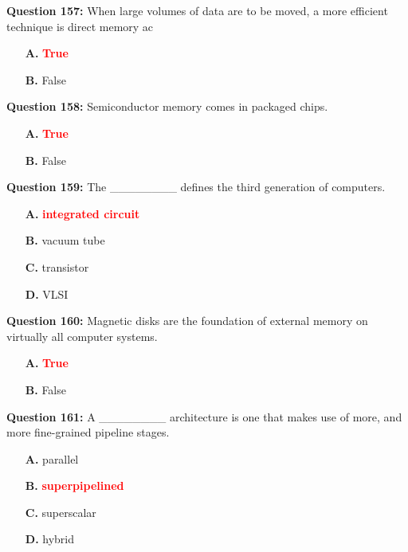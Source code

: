 \documentclass[12pt,a4paper]{article}
\begin{document}
\vspace{0.5cm}

\textbf{Question 157:} When large volumes of data are to be moved, a more efficient technique is direct memory ac

\begin{itemize}
    \item[\textbf{A.}] \textcolor{red}{\textbf{True}}
    \item[\textbf{B.}] False
\end{itemize}

\vspace{0.5cm}

\textbf{Question 158:} Semiconductor memory comes in packaged chips.

\begin{itemize}
    \item[\textbf{A.}] \textcolor{red}{\textbf{True}}
    \item[\textbf{B.}] False
\end{itemize}

\vspace{0.5cm}

\textbf{Question 159:} The ________ defines the third generation of computers.

\begin{itemize}
    \item[\textbf{A.}] \textcolor{red}{\textbf{integrated circuit}}
    \item[\textbf{B.}] vacuum tube
    \item[\textbf{C.}] transistor
    \item[\textbf{D.}] VLSI
\end{itemize}

\vspace{0.5cm}

\textbf{Question 160:} Magnetic disks are the foundation of external memory on virtually all computer systems.

\begin{itemize}
    \item[\textbf{A.}] \textcolor{red}{\textbf{True}}
    \item[\textbf{B.}] False
\end{itemize}

\vspace{0.5cm}

\textbf{Question 161:} A ________ architecture is one that makes use of more, and more fine-grained pipeline stages.

\begin{itemize}
    \item[\textbf{A.}] parallel
    \item[\textbf{B.}] \textcolor{red}{\textbf{superpipelined}}
    \item[\textbf{C.}] superscalar
    \item[\textbf{D.}] hybrid
\end{itemize}
\end{document}
